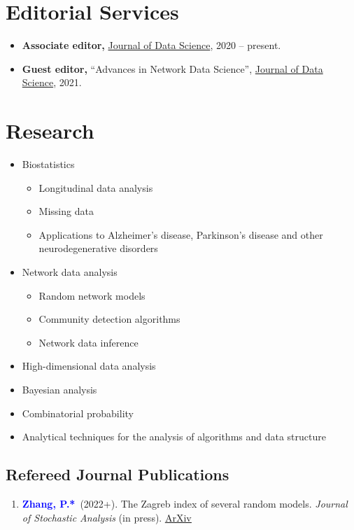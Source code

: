 \documentclass{res}
\newcommand{\PZ}{\textbf{\textcolor{blue}{Zhang, P.*}}}
\begin{document}
\begin{resume}
\section{Editorial Services}
\begin{itemize}
	\item \textbf{Associate editor,} 
	\href{https://jds-online.org/journal/JDS}{Journal of Data 
		Science}, 2020 -- present.
	\item \textbf{Guest editor,} ``Advances in Network Data 
	Science'', \href{https://jds-online.org/journal/JDS}{Journal of 
		Data Science}, 2021.
\end{itemize}
	
\section{Research}
\begin{itemize}
	\item Biostatistics
	\begin{itemize}
		\item Longitudinal data analysis
		\item Missing data
		\item Applications to Alzheimer's disease, Parkinson's 
		disease and other neurodegenerative disorders
	\end{itemize}
	\item Network data analysis
	\begin{itemize}
		\item Random network models
		\item Community detection algorithms
		\item Network data inference
	\end{itemize}
	\item High-dimensional data analysis 
	\item Bayesian analysis
	\item Combinatorial probability
	\item Analytical techniques for the analysis of algorithms and 
	data structure
\end{itemize}

\subsection{Refereed Journal Publications}
\begin{enumerate}
	\item \PZ\ (2022+). The Zagreb index of several random models. 
	{\em Journal of Stochastic Analysis} (in press). 
	\href{https://arxiv.org/pdf/1901.04657.pdf}{\underline{ArXiv}}
	

\end{enumerate}
\end{resume}
\end{document}
